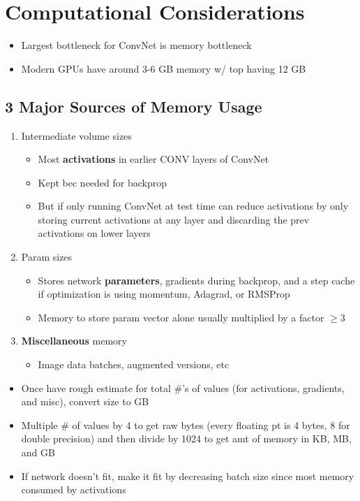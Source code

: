 \documentclass[a4paper,12pt]{article}
\begin{document}
\section{Computational Considerations}
\begin{itemize}
  \item Largest bottleneck for ConvNet is memory bottleneck
  \item Modern GPUs have around 3-6 GB memory w/ top having 12 GB
\end{itemize}

\subsection{3 Major Sources of Memory Usage}
\begin{enumerate}
  \item Intermediate volume sizes
  \begin{itemize}
    \item Most \textbf{activations} in earlier CONV layers of ConvNet
    \item Kept bec needed for backprop
    \item But if only running ConvNet at test time can reduce activations by only storing current activations at any layer and discarding the prev activations on lower layers
  \end{itemize}
  \item Param sizes
  \begin{itemize}
    \item Stores network \textbf{parameters}, gradients during backprop, and a step cache if optimization is using momentum, Adagrad, or RMSProp
    \item Memory to store param vector alone usually multiplied by a factor $\geq 3$
  \end{itemize}
  \item \textbf{Miscellaneous} memory
  \begin{itemize}
    \item Image data batches, augmented versions, etc
  \end{itemize}
\end{enumerate}


\begin{itemize}
  \item Once have rough estimate for total \#'s of values (for activations, gradients, and misc), convert size to GB
  \item Multiple \# of values by 4 to get raw bytes (every floating pt is 4 bytes, 8 for double precision) and then divide by 1024 to get amt of memory in KB, MB, and GB
  \item If network doesn't fit, make it fit by decreasing batch size since most memory consumed by activations
\end{itemize}
\end{document}

